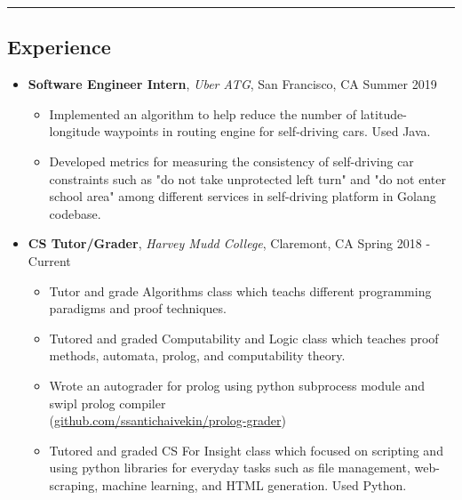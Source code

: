 \documentclass[10.5pt,letterpaper]{article}
\begin{document}
\hrule
\vspace{-0.95em}
\subsection*{Experience}
  \begin{itemize}
    \parskip=-0.45em
    \item[]
    {\textbf{Software Engineer Intern}, \textit{Uber ATG}, San Francisco, CA \hfill {Summer 2019}}
    \begin{itemize}[label=\textbullet]
      \itemsep0.1em
      \item Implemented an algorithm to help reduce the number of
      latitude-longitude waypoints in routing engine for self-driving cars. Used Java.
      \item Developed metrics for measuring the consistency of self-driving car constraints such as
      "do not take unprotected left turn" and "do not enter school area" among different services in 
      self-driving platform in Golang codebase.
    \end{itemize}
    \vspace{0.1em}
    \item[]
    {\textbf{CS Tutor/Grader}, \textit{Harvey Mudd College}, Claremont, CA \hfill {Spring 2018 - Current}}
    \begin{itemize}[label=\textbullet]
      \itemsep0.1em
      \item Tutor and grade Algorithms class which teachs different programming paradigms and proof techniques.
      \item Tutored and graded Computability and Logic class which teaches proof methods, automata, prolog,
      and computability theory. 
      \item Wrote an autograder for prolog using python subprocess module and swipl prolog compiler \\
      (\href{https://github.com/ssantichaivekin/prolog-grader}{github.com/ssantichaivekin/prolog-grader})
      \item Tutored and graded CS For Insight class which focused 
      on scripting and using python libraries for everyday tasks such as file management, web-scraping, 
      machine learning, and HTML generation. Used Python.
    \end{itemize}
    \vspace{0.1em}

\end{itemize}
\end{document}
